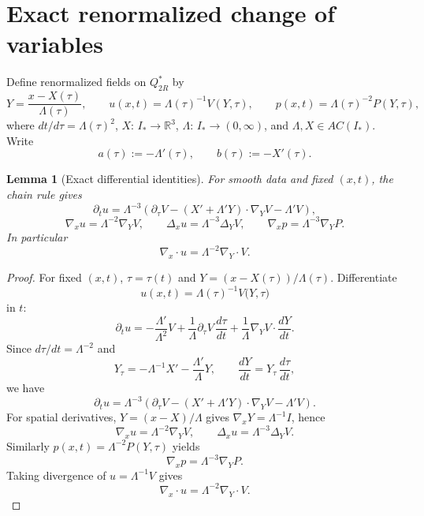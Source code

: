 \documentclass[11pt]{amsart}
\theoremstyle{plain}
\newtheorem{lemma}[theorem]{Lemma}
\theoremstyle{definition}
\theoremstyle{remark}
\newcommand{\RR}{\mathbb R}
\newcommand{\nn}{\nabla}
\begin{document}
\section{Exact renormalized change of variables}\label{sec:change}

Define renormalized fields on \(Q_{2R}^*\) by
\[
Y=\frac{x-X(\tau)}{\Lambda(\tau)},\qquad
u(x,t)=\Lambda(\tau)^{-1}V(Y,\tau),\qquad
p(x,t)=\Lambda(\tau)^{-2}P(Y,\tau),
\]
where \(dt/d\tau=\Lambda(\tau)^2\), \(X:\,I_*\to\RR^3\), \(\Lambda:\,I_*\to(0,\infty)\),
and \(\Lambda,X\in AC(I_*)\).
Write
\[
a(\tau):=-\Lambda'(\tau),\qquad
b(\tau):=-X'(\tau).
\]

\begin{lemma}[Exact differential identities]\label{lem:change-id}
For smooth data and fixed \((x,t)\), the chain rule gives
\[
\partial_t u
=\Lambda^{-3}\left(\partial_\tau V-(X'+\Lambda' Y)\cdot\nabla_Y V-\Lambda'V\right),
\]
\[
\nn_x u=\Lambda^{-2}\nn_Y V,\qquad \Delta_x u=\Lambda^{-3}\Delta_Y V,\qquad
\nn_x p=\Lambda^{-3}\nn_Y P.
\]
In particular
\[
\nn_x\cdot u=\Lambda^{-2}\nn_Y\cdot V.
\]
\end{lemma}
\begin{proof}
For fixed \((x,t)\), \(\tau=\tau(t)\) and \(Y=(x-X(\tau))/\Lambda(\tau)\).
Differentiate
\[
u(x,t)=\Lambda(\tau)^{-1}V\bigl(Y,\tau\bigr)
\]
in \(t\):
\[
\partial_t u
=-\frac{\Lambda'}{\Lambda^2}V
+\frac1\Lambda\partial_\tau V\,\frac{d\tau}{dt}
+\frac1\Lambda\nabla_YV\cdot\frac{dY}{dt}.
\]
Since \(d\tau/dt=\Lambda^{-2}\) and
\[
Y_\tau=-\Lambda^{-1}X'-\frac{\Lambda'}{\Lambda}Y,\qquad
\frac{dY}{dt}=Y_\tau\,\frac{d\tau}{dt},
\]
we have
\[
\partial_tu
=\Lambda^{-3}\left(\partial_\tau V-(X'+\Lambda'Y)\cdot\nabla_YV-\Lambda'V\right).
\]
For spatial derivatives, \(Y=(x-X)/\Lambda\) gives \(\nabla_xY=\Lambda^{-1}I\), hence
\[
\nabla_xu=\Lambda^{-2}\nabla_YV,\qquad
\Delta_xu=\Lambda^{-3}\Delta_YV.
\]
Similarly \(p(x,t)=\Lambda^{-2}P(Y,\tau)\) yields
\[
\nabla_x p=\Lambda^{-3}\nabla_YP.
\]
Taking divergence of \(u=\Lambda^{-1}V\) gives
\[
\nabla_x\cdot u=\Lambda^{-2}\nabla_Y\cdot V.
\]
\end{proof}
\end{document}
